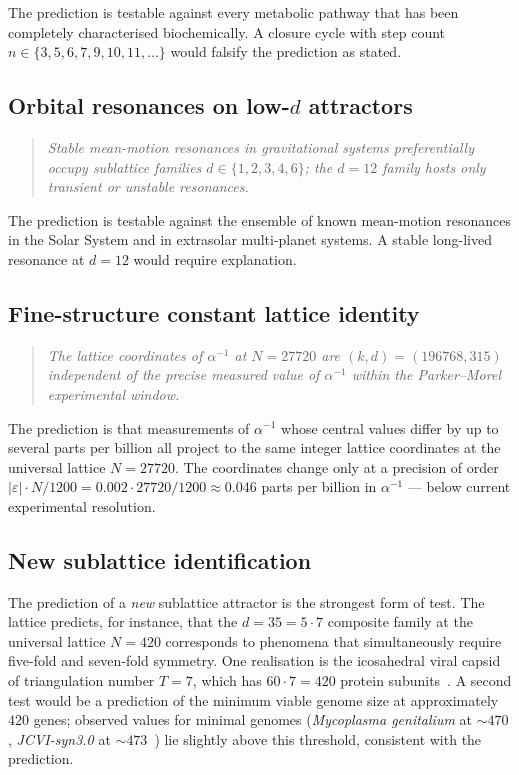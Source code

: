 \documentclass[11pt,a4paper]{article}
\theoremstyle{definition}
\theoremstyle{remark}
\newcommand{\eps}{\varepsilon}
\begin{document}
The prediction is testable against every metabolic pathway that has been completely characterised biochemically. A closure cycle with step count $n\in\{3,5,6,7,9,10,11,\ldots\}$ would falsify the prediction as stated.

\subsection{Orbital resonances on low-$d$ attractors}

\begin{quote}\itshape
Stable mean-motion resonances in gravitational systems preferentially occupy sublattice families $d\in\{1,2,3,4,6\}$; the $d=12$ family hosts only transient or unstable resonances.
\end{quote}

The prediction is testable against the ensemble of known mean-motion resonances in the Solar System and in extrasolar multi-planet systems. A stable long-lived resonance at $d=12$ would require explanation.

\subsection{Fine-structure constant lattice identity}

\begin{quote}\itshape
The lattice coordinates of $\alpha^{-1}$ at $N=27720$ are $(k,d)=(196768,315)$ independent of the precise measured value of $\alpha^{-1}$ within the Parker--Morel experimental window.
\end{quote}

The prediction is that measurements of $\alpha^{-1}$ whose central values differ by up to several parts per billion all project to the same integer lattice coordinates at the universal lattice $N=27720$. The coordinates change only at a precision of order $|\eps|\cdot N/1200 = 0.002\cdot 27720/1200 \approx 0.046$ parts per billion in $\alpha^{-1}$ --- below current experimental resolution.

\subsection{New sublattice identification}

The prediction of a \emph{new} sublattice attractor is the strongest form of test. The lattice predicts, for instance, that the $d=35 = 5\cdot 7$ composite family at the universal lattice $N=420$ corresponds to phenomena that simultaneously require five-fold and seven-fold symmetry. One realisation is the icosahedral viral capsid of triangulation number $T=7$, which has $60\cdot 7 = 420$ protein subunits~\cite{CasparKlug}. A second test would be a prediction of the minimum viable genome size at approximately $420$ genes; observed values for minimal genomes (\emph{Mycoplasma genitalium} at $\sim 470$, \emph{JCVI-syn3.0} at $\sim 473$~\cite{Hutchison2016}) lie slightly above this threshold, consistent with the prediction.
\end{document}
